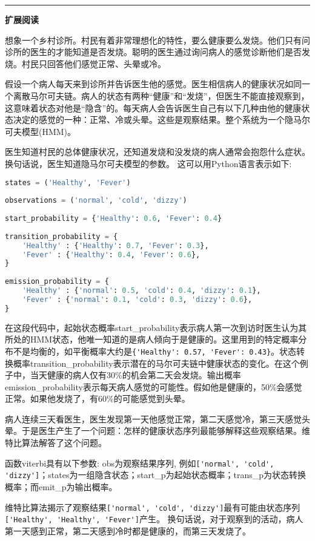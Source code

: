 \documentclass[11pt,a4paper,twoside]{book}
\begin{document}
\vspace{0.5cm}
\hrule height 3pt

\noindent
{\large \bfseries \HandPencilLeft 扩展阅读}

{\small
想象一个乡村诊所。村民有着非常理想化的特性，要么健康要么发烧。他们只有问诊所的医生的才能知道是否发烧。聪明的医生通过询问病人的感觉诊断他们是否发烧。村民只回答他们感觉正常、头晕或冷。

假设一个病人每天来到诊所并告诉医生他的感觉。医生相信病人的健康状况如同一个离散马尔可夫链。病人的状态有两种“健康”和“发烧”，但医生不能直接观察到，这意味着状态对他是“隐含”的。每天病人会告诉医生自己有以下几种由他的健康状态决定的感觉的一种：正常、冷或头晕。这些是观察结果。整个系统为一个隐马尔可夫模型(HMM)。

医生知道村民的总体健康状况，还知道发烧和没发烧的病人通常会抱怨什么症状。换句话说，医生知道隐马尔可夫模型的参数。 这可以用Python语言表示如下:

\begin{lstlisting}[language=python]
states = ('Healthy', 'Fever')
 
observations = ('normal', 'cold', 'dizzy')
 
start_probability = {'Healthy': 0.6, 'Fever': 0.4}
 
transition_probability = {
    'Healthy' : {'Healthy': 0.7, 'Fever': 0.3},
    'Fever' : {'Healthy': 0.4, 'Fever': 0.6},
}
 
emission_probability = {
    'Healthy' : {'normal': 0.5, 'cold': 0.4, 'dizzy': 0.1},
    'Fever' : {'normal': 0.1, 'cold': 0.3, 'dizzy': 0.6},
}
\end{lstlisting}

在这段代码中，起始状态概率start\_probability表示病人第一次到访时医生认为其所处的HMM状态，他唯一知道的是病人倾向于是健康的。这里用到的特定概率分布不是均衡的，如平衡概率大约是\verb|{'Healthy': 0.57, 'Fever': 0.43}|。状态转换概率transition\_probability表示潜在的马尔可夫链中健康状态的变化。在这个例子中，当天健康的病人仅有30\%的机会第二天会发烧。输出概率emission\_probability表示每天病人感觉的可能性。假如他是健康的，50\%会感觉正常。如果他发烧了，有60\%的可能感觉到头晕。

病人连续三天看医生，医生发现第一天他感觉正常，第二天感觉冷，第三天感觉头晕。于是医生产生了一个问题：怎样的健康状态序列最能够解释这些观察结果。维特比算法解答了这个问题。

函数viterbi具有以下参数: obs为观察结果序列, 例如\verb|['normal', 'cold', 'dizzy']|；states为一组隐含状态；start\_p为起始状态概率；trans\_p为状态转换概率；而emit\_p为输出概率。

维特比算法揭示了观察结果\verb|['normal', 'cold', 'dizzy']|最有可能由状态序列\verb|['Healthy', 'Healthy', 'Fever']|产生。 换句话说，对于观察到的活动，病人第一天感到正常，第二天感到冷时都是健康的，而第三天发烧了。
}
\end{document}
